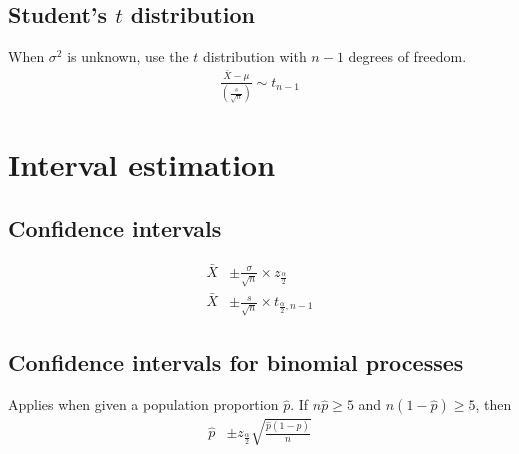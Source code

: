 \documentclass{article}
\newcommand{\soft}[1]{\left( #1 \right)}
\begin{document}
\begin{multicols*}{2}
\subsection{Student's $t$ distribution}
When $\sigma^2$ is unknown, use the $t$ distribution with $n - 1$ degrees of freedom.
\begin{align*}
    \frac{\bar{X} - \mu}{\soft{\frac{s}{\sqrt{n}}}} \sim t_{n - 1}
\end{align*}

\section{Interval estimation}

\subsection{Confidence intervals}
\begin{align*}
    \bar{X} &\pm \frac{\sigma}{\sqrt{n}} \times z_{\frac{\alpha}{2}} \\
    \bar{X} &\pm \frac{s}{\sqrt{n}} \times t_{\frac{\alpha}{2}, n - 1}
\end{align*}

\subsection{Confidence intervals for binomial processes}
Applies when given a population proportion $\hat{p}$. If $n\hat{p} \geq 5$ and $n(1 - \hat{p}) \geq 5$, then
\begin{align*}
    \hat{p} &\pm z_{\frac{\alpha}{2}} \sqrt{\frac{\hat{p} (1 - \hat{p})}{n}}
\end{align*}

\end{multicols*}
\end{document}
